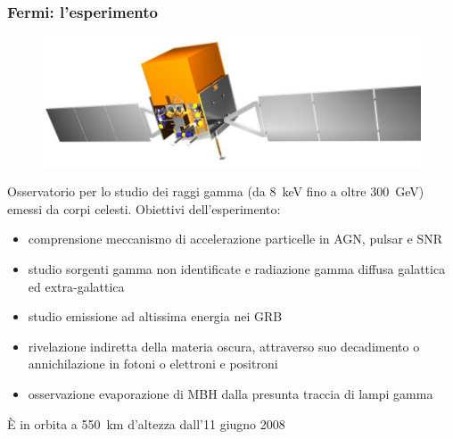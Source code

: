 \documentclass[10pt]{beamer}
\begin{document}
\begin{frame}
  \frametitle{Fermi: l'esperimento}
  \begin{figure}
    \centering
    \includegraphics[width=0.5\columnwidth]{glast.jpg}
  \end{figure}
  Osservatorio per lo studio dei raggi gamma (da \SI{8}{\kilo\electronvolt} fino
  a oltre \SI{300}{\giga\electronvolt}) emessi da corpi celesti.  Obiettivi
  dell'esperimento:
  \begin{itemize}
  \item comprensione \alert{meccanismo di accelerazione particelle} in AGN,
    pulsar e SNR
  \item studio \alert{sorgenti gamma non identificate} e
    \alert{radiazione gamma diffusa} galattica ed extra-galattica
  \item studio \alert{emissione ad altissima energia} nei GRB
  \item rivelazione indiretta della \alert{materia oscura}, attraverso suo
    decadimento o annichilazione in fotoni o elettroni e positroni
  \item osservazione \alert{evaporazione di MBH} dalla presunta traccia di lampi
    gamma
  \end{itemize}
  È in orbita a \SI{550}{\kilo\metre} d'altezza dall'11 giugno 2008
\end{frame}
\end{document}
